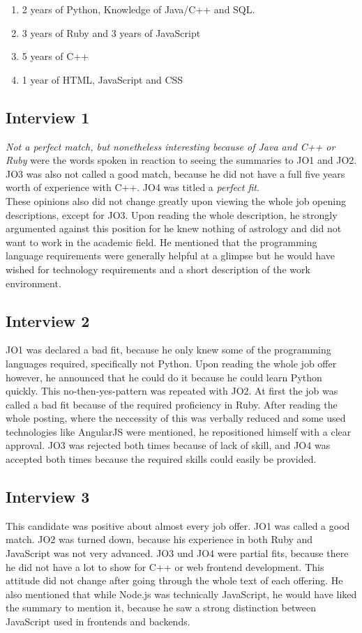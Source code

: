\begin{enumerate}
\item 2 years of Python, Knowledge of Java/C++ and SQL.
\item 3 years of Ruby and 3 years of JavaScript
\item 5 years of C++
\item 1 year of HTML, JavaScript and CSS
\end{enumerate}

\subsection{Interview 1}
\textit{Not a perfect match, but nonetheless interesting because of Java and C++ or Ruby} were the words spoken in reaction to seeing the summaries to JO1 and JO2. JO3 was also not called a good match, because he did not have a full five years worth of experience with C++. JO4 was titled a \textit{perfect fit}.\\
These opinions also did not change greatly upon viewing the whole job opening descriptions, except for JO3. Upon reading the whole description, he strongly argumented against this position for he knew nothing of astrology and did not want to work in the academic field. He mentioned that the programming language requirements were generally helpful at a glimpse but he would have wished for technology requirements and a short description of the work environment.

\subsection{Interview 2}
JO1 was declared a bad fit, because he only knew some of the programming languages required, specifically not Python. Upon reading the whole job offer however, he announced that he could do it because he could learn Python quickly. This no-then-yes-pattern was repeated with JO2. At first the job was called a bad fit because of the required proficiency in Ruby. After reading the whole posting, where the neccessity of this was verbally reduced and some used technologies like AngularJS were mentioned, he repositioned himself with a clear approval. JO3 was rejected both times because of lack of skill, and JO4 was accepted both times because the required skills could easily be provided.

\subsection{Interview 3}
This candidate was positive about almost every job offer. JO1 was called a good match. JO2 was turned down, because his experience in both Ruby and JavaScript was not very advanced. JO3 und JO4 were partial fits, because there he did not have a lot to show for C++ or web frontend development. This attitude did not change after going through the whole text of each offering. He also mentioned that while Node.js was technically JavaScript, he would have liked the summary to mention it, because he saw a strong distinction between JavaScript used in frontends and backends.

